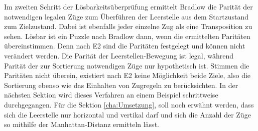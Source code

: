 Im zweiten Schritt der Lösbarkeitsüberprüfung ermittelt Bradlow die Parität der notwendigen legalen Züge zum Überführen der Leerstelle aus dem Startzustand zum Zielzustand. Dabei ist ebenfalls jeder einzelne Zug als eine Transposition zu sehen.\WNL%
Lösbar ist ein Puzzle nach Bradlow dann, wenn die ermittelten Paritäten übereinstimmen. Denn nach E2 sind die Paritäten festgelegt und können nicht verändert werden. Die Parität der Leerstellen-Bewegung ist legal, während Parität der zur Sortierung notwendigen Züge nur hypothetisch ist. Stimmen die Paritäten nicht überein, existiert nach E2 keine Möglichkeit beide Ziele, also die Sortierung ebenso wie das Einhalten von Zugregeln zu berücksichten.
\WNL
In der nächsten Sektion wird dieses Verfahren an einem Beispiel schrittweise durchgegangen.
\WNL
Für die Sektion \ref*{cha:Umsetzung}, soll noch erwähnt werden, dass sich die Leerstelle nur horizontal und vertikal  darf und sich die Anzahl der Züge so mithilfe der Manhattan-Distanz ermitteln lässt.

